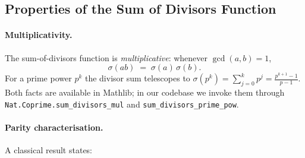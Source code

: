 \subsection{Properties of the Sum of Divisors Function}
\label{subsec:sigma_properties}

\paragraph{Multiplicativity.}
The sum-of-divisors function is \emph{multiplicative}: whenever
$\gcd(a,b)=1$,
%
\begin{equation}\label{eq:sigma-mult}
  \sigma(ab) \;=\; \sigma(a)\,\sigma(b).
\end{equation}
%
For a prime power $p^k$ the divisor sum telescopes to
$\sigma(p^{k}) = \sum_{j=0}^{k} p^{j} = \frac{p^{k+1}-1}{p-1}$.
Both facts are available in Mathlib; in our codebase we invoke them
through
\texttt{Nat.Coprime.sum\_\allowbreak{}divisors\_\allowbreak{}mul}
and
\texttt{sum\_\allowbreak{}divisors\_\allowbreak{}prime\_\allowbreak{}pow}.

\paragraph{Parity characterisation.}
A classical result states:

